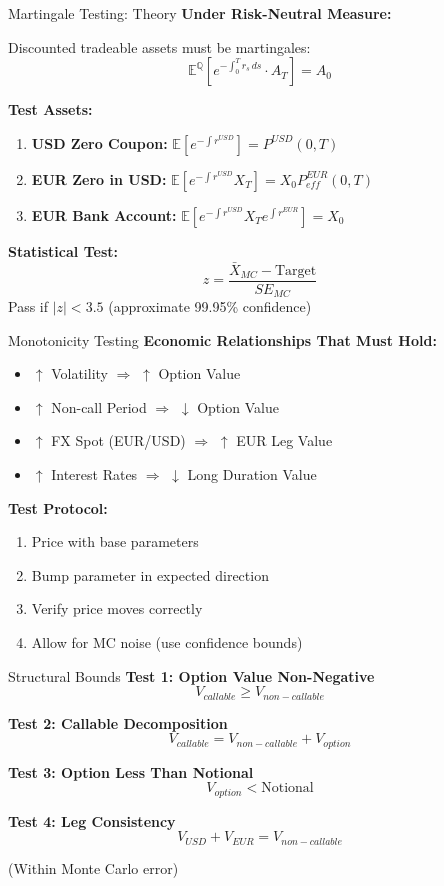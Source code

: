 \documentclass[aspectratio=169,11pt]{beamer}
\begin{document}
\begin{frame}{Martingale Testing: Theory}
\textbf{Under Risk-Neutral Measure:}

Discounted tradeable assets must be martingales:
\[
\mathbb{E}^\mathbb{Q}[e^{-\int_0^T r_s\,ds} \cdot A_T] = A_0
\]

\textbf{Test Assets:}
\begin{enumerate}
    \item \textbf{USD Zero Coupon:} $\mathbb{E}[e^{-\int r^{USD}}] = P^{USD}(0,T)$
    \item \textbf{EUR Zero in USD:} $\mathbb{E}[e^{-\int r^{USD}} X_T] = X_0 P^{EUR}_{eff}(0,T)$
    \item \textbf{EUR Bank Account:} $\mathbb{E}[e^{-\int r^{USD}} X_T e^{\int r^{EUR}}] = X_0$
\end{enumerate}

\textbf{Statistical Test:}
\[
z = \frac{\bar{X}_{MC} - \text{Target}}{SE_{MC}}
\]
Pass if $|z| < 3.5$ (approximate 99.95\% confidence)
\end{frame}

\begin{frame}{Monotonicity Testing}
\textbf{Economic Relationships That Must Hold:}

\begin{itemize}
    \item $\uparrow$ Volatility $\Rightarrow$ $\uparrow$ Option Value
    \item $\uparrow$ Non-call Period $\Rightarrow$ $\downarrow$ Option Value
    \item $\uparrow$ FX Spot (EUR/USD) $\Rightarrow$ $\uparrow$ EUR Leg Value
    \item $\uparrow$ Interest Rates $\Rightarrow$ $\downarrow$ Long Duration Value
\end{itemize}

\textbf{Test Protocol:}
\begin{enumerate}
    \item Price with base parameters
    \item Bump parameter in expected direction
    \item Verify price moves correctly
    \item Allow for MC noise (use confidence bounds)
\end{enumerate}
\end{frame}

\begin{frame}{Structural Bounds}
\textbf{Test 1: Option Value Non-Negative}
\[
V_{callable} \geq V_{non-callable}
\]

\textbf{Test 2: Callable Decomposition}
\[
V_{callable} = V_{non-callable} + V_{option}
\]

\textbf{Test 3: Option Less Than Notional}
\[
V_{option} < \text{Notional}
\]

\textbf{Test 4: Leg Consistency}
\[
V_{USD} + V_{EUR} = V_{non-callable}
\]

(Within Monte Carlo error)
\end{frame}
\end{document}
